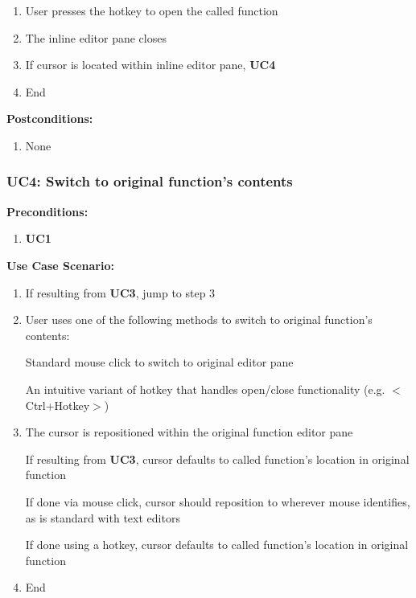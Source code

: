 \documentclass[]{report}
\begin{document}
		\begin{enumerate}
			\item
			User presses the hotkey to open the called function
			
			\item 
			The inline editor pane closes
			
			\item 
			If cursor is located within inline editor pane, \textbf{UC4}
			
			\item
			End
		\end{enumerate}
		
		\noindent\textbf{Postconditions:}
		
		\begin{enumerate}
			
			\item 
			None
			
		\end{enumerate}
		
		\vspace{0.25in}
		
		\subsubsection{UC4:  Switch to original function's contents}
		
		\textbf{Preconditions:}
		
		\begin{enumerate}
			
			\item \textbf{UC1}
			
		\end{enumerate}
		
		\noindent\textbf{Use Case Scenario:}
		
		\begin{enumerate}
			
			\item 
			If resulting from \textbf{UC3}, jump to step 3
			
			\item
			User uses one of the following methods to switch to original function's contents:
			
				\subitem
				Standard mouse click to switch to original editor pane
				
				\subitem
				An intuitive variant of hotkey that handles open/close functionality (e.g. $<$Ctrl+Hotkey$>$)
			
			\item 
			The cursor is repositioned within the original function editor pane
			
				\subitem
				If resulting from \textbf{UC3}, cursor defaults to called function's location in original function
			
				\subitem
				If done via mouse click, cursor should reposition to wherever mouse identifies, as is standard with text editors
				
				\subitem
				If done using a hotkey, cursor defaults to called function's location in original function
			
			\item
			End
		\end{enumerate}
		
\end{document}

